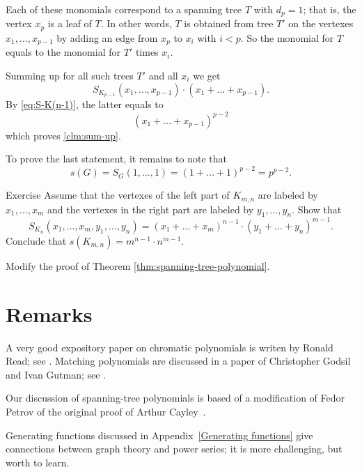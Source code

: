 Each of these monomials correspond to a spanning tree $T$ with $d_p=1$;
that is, the vertex $x_p$ is a leaf of $T$.
In other words, $T$ is obtained from tree $T'$ on the vertexes $x_1,\dots,x_{p-1}$ 
by adding an edge from $x_p$ to $x_i$ with $i<p$.
So the monomial for $T$ equals to the monomial for $T'$ times $x_i$.

Summing up for all such trees $T'$ and all $x_i$ we get 
\[S_{K_{p-1}}(x_1,\dots,x_{p-1})\cdot(x_1+\dots+x_{p-1}).\]
By \ref{eq:S-K(n-1)}, the latter equals to
\[(x_1+\dots+x_{p-1})^{p-2}\]
which proves \ref{clm:sum-up}.

To prove the last statement, it remains to note that 
\[s(G)=S_G(1,\dots,1)=(1+\dots+1)^{p-2}=p^{p-2}.\]
\qedsf

\begin{thm}{Exercise}
Assume that the vertexes of the left part of $K_{m,n}$ are labeled by $x_1,\dots,x_m$ and the vertexes in the right part are labeled by $y_1,\dots,y_n$. 
Show that
\[S_{K_n}(x_1,\dots,x_m,y_1,\dots,y_n)=(x_1+\dots +x_m)^{n-1}\cdot(y_1+\dots +y_n)^{m-1}.\]
Conclude that $s(K_{m,n})=m^{n-1}\cdot n^{m-1}$.

\end{thm}

 Modify the proof of Theorem \ref{thm:spanning-tree-polynomial}.

\section*{Remarks}

A very good expository paper on chromatic polynomials is writen by
Ronald Read; see \cite{read}. 
Matching polynomials are discussed in a paper of Christopher Godsil and Ivan Gutman; see \cite{godsil-gutman}.

Our discussion of spanning-tree polynomials is based of a modification of Fedor Petrov \cite{petrov} of the original proof of Arthur Cayley~\cite{cayley}. 

Generating functions discussed in Appendix~\ref{Generating functions} give connections between graph theory and power series; it is more challenging, but worth to learn.   
